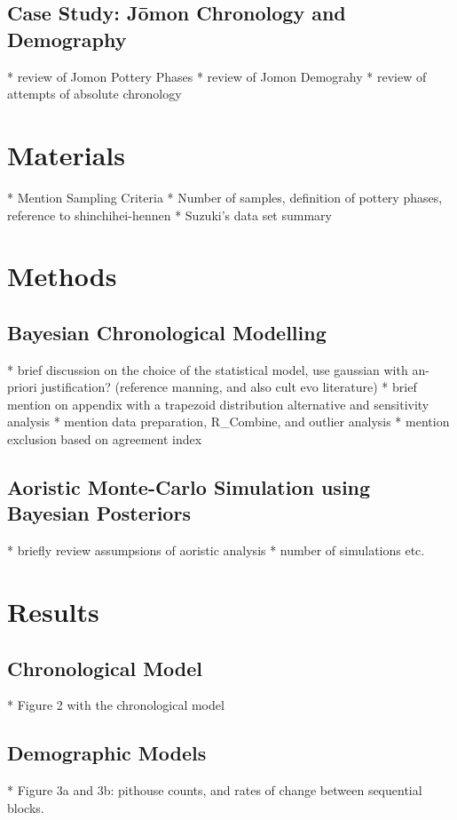 \documentclass[review]{elsarticle}
\begin{document}
\subsection{Case Study: J\={o}mon Chronology and Demography}
* review of Jomon Pottery Phases
* review of Jomon Demograhy
* review of attempts of absolute chronology


\section{Materials}
* Mention Sampling Criteria
* Number of samples, definition of pottery phases, reference to shinchihei-hennen 
* Suzuki's data set summary

\section{Methods}
\subsection{Bayesian Chronological Modelling}
* brief discussion on the choice of the statistical model, use gaussian with an-priori justification? (reference manning, and also cult evo literature)
* brief mention on appendix with a trapezoid distribution alternative and sensitivity analysis
* mention data preparation, R\_Combine, and outlier analysis
* mention exclusion based on agreement index

\subsection{Aoristic Monte-Carlo Simulation using Bayesian Posteriors}
* briefly review assumpsions of aoristic analysis
* number of simulations etc.


\section{Results}
\subsection{Chronological Model}
* Figure 2 with the chronological model
\subsection{Demographic Models}
* Figure 3a and 3b: pithouse counts, and rates of change between sequential blocks.  
\end{document}

